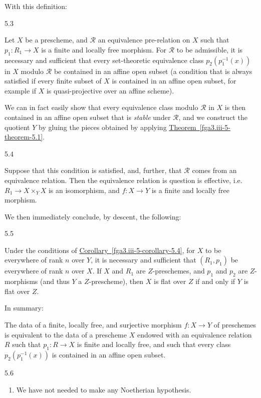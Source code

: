   With this definition:\begin{theorem}{5.3}\label{fga3.iii-5-theorem-5.3}\skipsinglepar\par{}Let \(X\) be a prescheme, and \(\mathcal {R}\) an equivalence pre-relation on \(X\) such that \(p_1\colon  R_1\to  X\) is a finite and locally free morphism.
    For \(\mathcal {R}\) to be admissible, it is necessary and sufficient that every set-theoretic equivalence class \(p_2(p_1^{-1}(x))\) in \(X\) modulo \(\mathcal {R}\) be contained in an affine open subset (a condition that is always satisfied if every finite subset of \(X\) is contained in an affine open subset, for example if \(X\) is quasi-projective over an affine scheme).\end{theorem}\par{}We can in fact easily show that every equivalence class modulo \(\mathcal {R}\) in \(X\) is then contained in an affine open subset that is \emph{stable} under \(\mathcal {R}\), and we construct the quotient \(Y\) by gluing the pieces obtained by applying \hyperref[fga3.iii-5-theorem-5.1]{Theorem~\ref*{fga3.iii-5-theorem-5.1}}.\begin{corollary}{5.4}\label{fga3.iii-5-corollary-5.4}\skipsinglepar\par{}Suppose that this condition is satisfied, and, further, that \(\mathcal {R}\) comes from an equivalence relation.
    Then the equivalence relation is question is effective, i.e. \(R_1\to  X\times _Y X\) is an isomorphism, and \(f\colon  X\to  Y\) is a finite and locally free morphism.\end{corollary}\par{}We then immediately conclude, by descent, the following:\begin{corollary}{5.5}\label{fga3.iii-5-corollary-5.5}\skipsinglepar\par{}Under the conditions of \hyperref[fga3.iii-5-corollary-5.4]{Corollary~\ref*{fga3.iii-5-corollary-5.4}}, for \(X\) to be everywhere of rank \(n\) over \(Y\), it is necessary and sufficient that \((R_1,p_1)\) be everywhere of rank \(n\) over \(X\).
    If \(X\) and \(R_1\) are \(Z\)-preschemes, and \(p_1\) and \(p_2\) are \(Z\)-morphisms (and thus \(Y\) a \(Z\)-prescheme), then \(X\) is flat over \(Z\) if and only if \(Y\) is flat over \(Z\).\end{corollary}\par{}In summary:\begin{scholium}{}\label{fga3.iii-5-scholium}\skipsinglepar\par{}The data of a finite, locally free, and surjective morphism \(f\colon  X\to  Y\) of preschemes is equivalent to the data of a prescheme \(X\) endowed with an equivalence relation \(R\) such that \(p_1\colon  R\to  X\) is finite and locally free, and such that every class \(p_2(p_1^{-1}(x))\) is contained in an affine open subset.\end{scholium}\begin{remarks}{5.6}\label{fga3.iii-5-remarks-5.6}\skipsinglepar\begin{enumerate}\item{}We have not needed to make any Noetherian hypothesis.


\end{enumerate}
\end{remarks}
